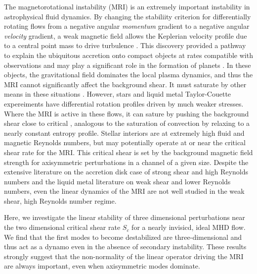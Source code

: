 \documentclass[aps,prl,reprint,superscriptaddress]{revtex4-1}
\begin{document}
The magnetorotational instability (MRI) is an extremely important instability in astrophysical fluid dynamics.
By changing the stabiliity criterion for differentially rotating flows from a negative angular \emph{momentum} gradient to a negative angular \emph{velocity} gradient, a weak magnetic field allows the Keplerian velocity profile due to a central point mass to drive turbulence \citep[e.g.][]{1998RvMP...70....1B}.
This discovery provided a pathway to explain the ubiquitous accretion onto compact objects at rates compatible with observations and may play a significant role in the formation of planets \citep[e.g.][]{2007Natur.448.1022J}.
In these objects, the gravitational field dominates the local plasma dynamics, and thus the MRI cannot significantly affect the background shear.
It must saturate by other means in these situations \citep{2018MNRAS.474.3451X}.
However, stars and liquid metal Taylor-Couette expereiments have differential rotation profiles driven by much weaker stresses.
Where the MRI is active in these flows, it can sature by pushing the background shear close to critical \citep{2017ApJ...841....1C,2017ApJ...841....2C}, analogous to the saturation of convection by relaxing to a nearly constant entropy profile.
Stellar interiors are at extremely high fluid and magnetic Reynolds numbers, but may potentially operate at or near the critical shear rate for the MRI\@.
This critical shear is set by the background magnetic field strength for axisymmetric perturbations in a channel of a given size.
Despite the extensive literature on the accretion disk case of strong shear and high Reynolds numbers and the liquid metal literature on weak shear and lower Reynolds numbers, even the linear dynamics of the MRI are not well studied in the weak shear, high Reynolds number regime.

Here, we investigate the linear stability of three dimensional perturbations near the two dimensional critical shear rate $S_c$ for a nearly invisicd, ideal MHD flow.
We find that the first modes to become destabilized are three-dimensional and thus act as a dynamo even in the absence of secondary instability.
These results strongly suggest that the non-normality of the linear operator driving the MRI are always important, even when axisymmetric modes dominate.
\end{document}
